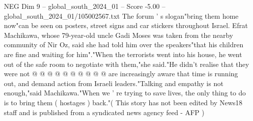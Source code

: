 \begin{textsample}{NEG Dim 9 – global\_south\_2024\_01 – Score -5.00 – global\_south\_2024\_01/105002567.txt}
The forum ' s slogan"bring them home now"can be seen on posters, street signs and car stickers throughout Israel.
Efrat Machikawa, whose 79-year-old uncle Gadi Moses was taken from the nearby community of Nir Oz, said she had told him over the speakers"that his children are fine and waiting for him"."When the terrorists went into his house, he went out of the safe room to negotiate with them,"she said."He didn't realise that they were not @ @ @ @ @ @ @ @ @ @ are increasingly aware that time is running out, and demand action from Israeli leaders."Talking and empathy is not enough,"said Machikawa."When we ' re trying to save lives, the only thing to do is to bring them ( hostages ) back."( This story has not been edited by News18 staff and is published from a syndicated news agency feed - AFP )

\end{textsample}
